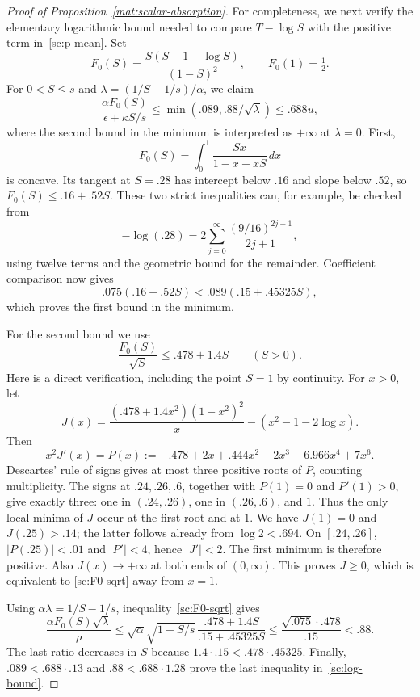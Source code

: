 \begin{proof}[Proof of Proposition~\ref{mat:scalar-absorption}]
For completeness, we next verify the elementary logarithmic bound needed
to compare $T-\log S$ with the positive term in~\eqref{sc:p-mean}.
Set
\[
 F_0(S)=\frac{S(S-1-\log S)}{(1-S)^2},\qquad F_0(1)=\tfrac12.
\]
For $0<S\le s$ and $\lambda=(1/S-1/s)/\alpha$, we claim
\begin{equation}\label{sc:log-bound}
 \frac{\alpha F_0(S)}{\epsilon+\kappa S/s}
 \le\min(.089,.88/\sqrt\lambda)\le .688u,
\end{equation}
where the second bound in the minimum is interpreted as $+\infty$ at
$\lambda=0$.  First,
\[
 F_0(S)=\int_0^1 \frac{Sx}{1-x+xS}\,dx
\]
is concave.  Its tangent at $S=.28$ has intercept below $.16$ and slope
below $.52$, so $F_0(S)\le .16+.52S$.  These two strict inequalities
can, for example, be checked from
\[
 -\log(.28)=2\sum_{j=0}^{\infty}\frac{(9/16)^{2j+1}}{2j+1},
\]
using twelve terms and the geometric bound for the remainder.
Coefficient comparison now gives
\[
 .075(.16+.52S)<.089(.15+.45325S),
\]
which proves the first bound in the minimum.

For the second bound we use
\begin{equation}\label{sc:F0-sqrt}
 \frac{F_0(S)}{\sqrt S}\le .478+1.4S\qquad(S>0).
\end{equation}
Here is a direct verification, including the point $S=1$ by continuity.
For $x>0$, let
\[
 J(x)=\frac{(.478+1.4x^2)(1-x^2)^2}{x}
       -(x^2-1-2\log x).
\]
Then
\[
 x^2J'(x)=P(x):=-.478+2x+.444x^2-2x^3-6.966x^4+7x^6.
\]
Descartes' rule of signs gives at most three positive roots of $P$,
counting multiplicity.  The signs at $.24,.26,.6$, together with
$P(1)=0$ and $P'(1)>0$, give exactly three: one in $(.24,.26)$, one in
$(.26,.6)$, and $1$.  Thus the only local minima of $J$ occur at the
first root and at $1$.  We have $J(1)=0$ and $J(.25)>.14$; the latter
follows already from $\log2<.694$.  On $[.24,.26]$,
$|P(.25)|<.01$ and $|P'|<4$, hence $|J'|<2$.
The first minimum is therefore positive.  Also $J(x)\to+\infty$ at
both ends of $(0,\infty)$.  This proves $J\ge0$, which is equivalent to
\eqref{sc:F0-sqrt} away from $x=1$.

Using $\alpha\lambda=1/S-1/s$, inequality~\eqref{sc:F0-sqrt} gives
\[
 \frac{\alpha F_0(S)\sqrt\lambda}{\rho}
 \le \sqrt\alpha\sqrt{1-S/s}\,
       \frac{.478+1.4S}{.15+.45325S}
 \le \frac{\sqrt{.075}\cdot .478}{.15}<.88.
\]
The last ratio decreases in $S$ because
$1.4\cdot.15<.478\cdot.45325$.  Finally,
$.089<.688\cdot.13$ and $.88<.688\cdot1.28$ prove the last inequality
in~\eqref{sc:log-bound}.


\end{proof}
